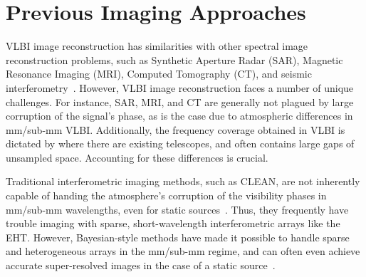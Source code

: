 \vspace{-.1in}
\section{Previous Imaging Approaches}
\label{sec:setup}

VLBI image reconstruction has similarities with other spectral image reconstruction problems, such as Synthetic Aperture Radar (SAR), Magnetic Resonance Imaging (MRI), Computed Tomography (CT), and seismic interferometry~\cite{bracewell2004fourier, lustig2007sparse, 1456966,demanet}. 
However, VLBI image reconstruction faces a number of unique challenges.
For instance, SAR, MRI, and CT are generally not plagued by large corruption of the signal's phase, as is the case due to atmospheric differences in mm/sub-mm VLBI. Additionally, the frequency coverage obtained in VLBI is dictated by where there are existing telescopes, and often contains large gaps of unsampled space.  
Accounting for these differences is crucial.




Traditional interferometric imaging methods, such as CLEAN, are not inherently capable of handing the atmosphere's corruption of the visibility phases in mm/sub-mm wavelengths, even for static sources~\cite{hogbom1974aperture, taylor1999synthesis}. Thus, they frequently have trouble imaging with sparse, short-wavelength interferometric arrays like the EHT. 
However, Bayesian-style methods have made it possible to handle sparse and heterogeneous arrays in the mm/sub-mm regime, and can often even achieve accurate super-resolved images in the case of a static source~\cite{Narayan_Nityananda_1986, skilling1990quantified,  andrew}.


